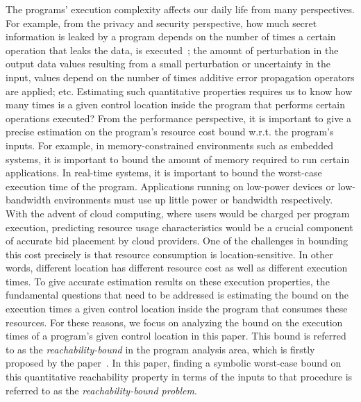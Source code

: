 The programs' execution complexity affects our daily life from many perspectives.
For example,
from the privacy and security perspective,
how much secret information is leaked by a program depends on the number of times a certain operation that leaks the data,
is executed~\cite{Malacaria07};
the amount of perturbation in the output data values resulting
from a small perturbation or uncertainty in the input,
values depend on the number of times additive error propagation operators are applied; etc.
Estimating such quantitative properties requires us to know
how many times is a given control location inside the program that performs certain operations executed?
From the performance perspective, it is important to give a precise estimation
on the program's resource cost bound w.r.t. the program's inputs.
For example, in memory-constrained environments such as embedded systems,
it is important to bound the amount of memory required to run certain applications.
In real-time systems, it is important to bound the worst-case execution time of the program.
Applications running on low-power devices or low-bandwidth environments must use up little power or bandwidth respectively. 
With the advent of cloud computing, where users would be charged per program execution,
predicting resource usage characteristics would be a crucial component of accurate bid placement by cloud providers. 
One of the challenges in bounding this cost precisely is that resource consumption is location-sensitive.
In other words, different location has different resource cost as well as different execution times.
To give accurate estimation results on these execution properties,
the fundamental questions that need to be addressed 
is estimating the bound on the execution times
a given control location inside the program that consumes these resources.
For these reasons, we focus on analyzing the bound on the execution times of a program's given control location in this paper.
This bound is referred to as the \emph{reachability-bound} in the program analysis area,
which is firstly proposed by the paper~\cite{GulwaniZ10}.
In this paper, finding a symbolic worst-case bound on this quantitative reachability property
in terms of the inputs to that procedure
is referred to as the \emph{reachability-bound problem}.


